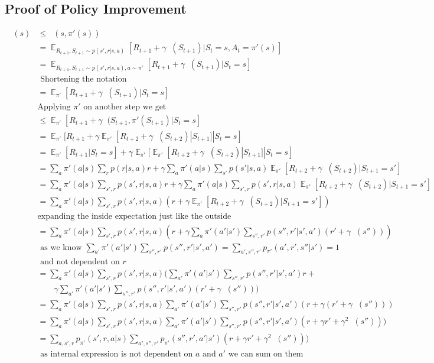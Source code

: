 \documentclass{article}
\DeclareMathOperator{\qp}{q_\pi} %
\DeclareMathOperator{\vp}{v_\pi} %
\DeclareMathOperator{\E}{\mathds{E}}
\begin{document}
\subsection{Proof of Policy Improvement}
\begin{align*}
	\vp(s) & \leq \qp(s,\pi'(s))\\
	&= \E_{R_{t+1},S_{t+1} \sim p(s',r|s,a) }[ R_{t+1}+ \gamma \vp(S_{t+1}) | S_t = s, A_t = \pi'(s)]\\
	&= \E_{R_{t+1},S_{t+1} \sim p(s',r|s,a) ,a \sim \pi'}[ R_{t+1}+ \gamma \vp(S_{t+1}) | S_t = s]\\
	& \text{ Shortening the notation}\\
	&= \E_{\pi'}[ R_{t+1}+ \gamma \vp(S_{t+1}) | S_t = s]\\
	& \text{Applying $\pi'$ on another step we get}\\
	& \leq  \E_{\pi'}[ R_{t+1} + \gamma \qp(S_{t+1}, \pi'(S_{t+1}) | S_t = s]\\
	& = \E_{\pi'}[ R_{t+1} + \gamma  \E_{\pi'}[R_{t+2} + \gamma \vp(S_{t+2}) | S_{t+1}]    | S_t = s]\\
	& = \E_{\pi'} [ R_{t+1} | S_t = s]+ \gamma   \E_{\pi'} [ \E_{\pi'}[R_{t+2} + \gamma \vp(S_{t+2}) | S_{t+1}]    | S_t = s]\\
	& =  \sum_a \pi'(a|s) \sum_{r} p(r|s,a) r + \gamma   \sum_a \pi'(a|s) \sum_{s'} p(s'|s,a)\E_{\pi'}[R_{t+2} + \gamma \vp(S_{t+2}) | S_{t+1} = s']    \\
	& =  \sum_a \pi'(a|s) \sum_{s',r} p(s',r|s,a) r + \gamma   \sum_a \pi'(a|s) \sum_{s',r} p(s',r|s,a)\E_{\pi'}[R_{t+2} + \gamma \vp(S_{t+2}) | S_{t+1} = s']    \\
	& =  \sum_a \pi'(a|s) \sum_{s',r} p(s',r|s,a)  ( r + \gamma \E_{\pi'}[R_{t+2} + \gamma \vp(S_{t+2}) | S_{t+1} = s']   )\\
	& \text{expanding the inside expectation just like the outside}\\
	& =  \sum_a \pi'(a|s) \sum_{s',r} p(s',r|s,a)  ( r + \gamma\sum_a \pi'(a'|s') \sum_{s'',r'} p(s'',r'|s',a')  ( r' + \gamma \vp(s'') )   )\\
	& \text{ as we know $\sum_{a'} \pi'(a'|s') \sum_{s'',r'} p(s'',r'|s',a') = \sum_{a',s'',r'} p_{\pi'}(a',r',s'' | s') = 1$}\\
	&\text{ and not dependent on $r$}\\
	& =  \sum_a \pi'(a|s) \sum_{s',r} p(s',r|s,a)  ( \sum_{a'} \pi'(a'|s')  \sum_{s'',r'} p(s'',r'|s',a') r + \\
	& \qquad \gamma\sum_{a'} \pi'(a'|s') \sum_{s'',r'} p(s'',r'|s',a')  ( r' + \gamma \vp(s'') )   )\\
	& =  \sum_a \pi'(a|s) \sum_{s',r} p(s',r|s,a)  \sum_{a'} \pi'(a'|s')  \sum_{s'',r'} p(s'',r'|s',a') (r +  \gamma  ( r' + \gamma \vp(s'') )   )\\
	& =  \sum_a \pi'(a|s) \sum_{s',r} p(s',r|s,a)  \sum_{a'} \pi'(a'|s')  \sum_{s'',r'} p(s'',r'|s',a') (r +  \gamma  r' + \gamma^2 \vp(s'') )   )\\
	& = \sum_{a,s',r} p_{\pi'}(s',r,a|s ) \sum_{a',s'',r'} p_{\pi'}(s'',r',a'|s' )(r +  \gamma  r' + \gamma^2 \vp(s'') )   )\\
	&  \text{ as internal expression is not dependent on $a$ and $a'$ we can sum on them}\\
	\end{align*}
\end{document}
